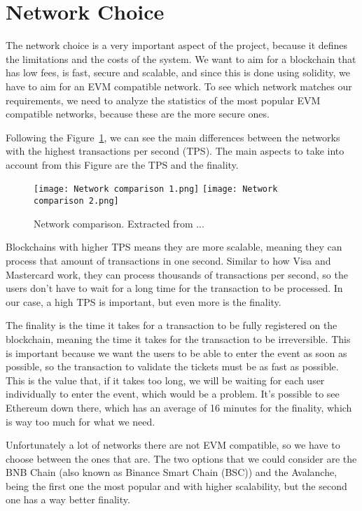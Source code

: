 \section{Network Choice}
\label{sec:network_choice}

The network choice is a very important aspect of the project, because it
defines the limitations and the costs of the system. We want to aim for a
blockchain that has low fees, is fast, secure and scalable, and since this is
done using solidity, we have to aim for an EVM compatible network. To see which
network matches our requirements, we need to analyze the statistics of the most
popular EVM compatible networks, because these are the more secure ones.

Following the Figure~\ref{fig:network_comparison}, we can see the main
differences between the networks with the highest transactions per second
(TPS). The main aspects to take into account from this Figure are the TPS and
the finality.

\begin{figure}[H]
    \texttt{[image: Network comparison 1.png]}
    \texttt{[image: Network comparison 2.png]}
    \centering
    \caption{Network comparison. Extracted from ...}
    \label{fig:network_comparison}
\end{figure}

Blockchains with higher TPS means they are more scalable, meaning they can
process that amount of transactions in one second. Similar to how Visa and
Mastercard work, they can process thousands of transactions per second, so the
users don't have to wait for a long time for the transaction to be processed.
In our case, a high TPS is important, but even more is the finality.

The finality is the time it takes for a transaction to be fully registered on
the blockchain, meaning the time it takes for the transaction to be
irreversible. This is important because we want the users to be able to enter
the event as soon as possible, so the transaction to validate the tickets must
be as fast as possible. This is the value that, if it takes too long, we will
be waiting for each user individually to enter the event, which would be a
problem. It's possible to see Ethereum down there, which has an average of 16
minutes for the finality, which is way too much for what we need.

Unfortunately a lot of networks there are not EVM compatible, so we have to
choose between the ones that are. The two options that we could consider are
the BNB Chain (also known as Binance Smart Chain (BSC)) and the Avalanche,
being the first one the most popular and with higher scalability, but the
second one has a way better finality.

